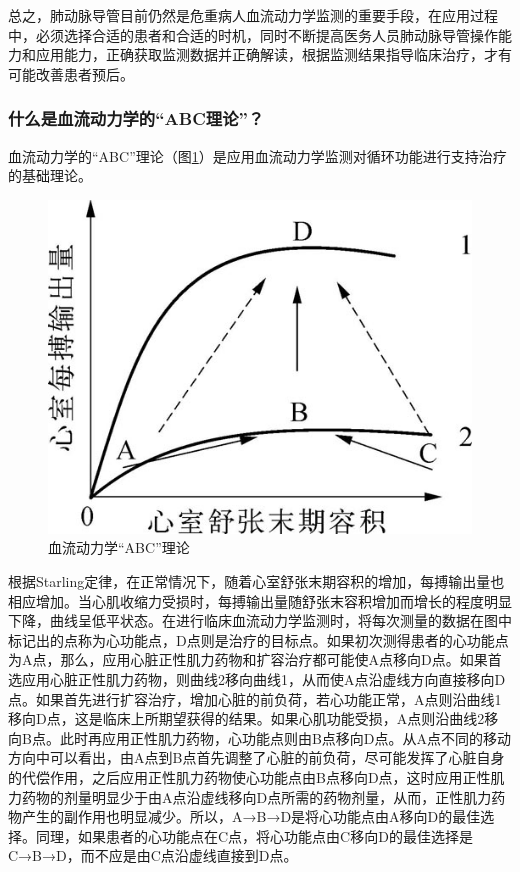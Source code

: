 总之，肺动脉导管目前仍然是危重病人血流动力学监测的重要手段，在应用过程中，必须选择合适的患者和合适的时机，同时不断提高医务人员肺动脉导管操作能力和应用能力，正确获取监测数据并正确解读，根据监测结果指导临床治疗，才有可能改善患者预后。

\subsubsection{什么是血流动力学的“ABC理论”？}

血流动力学的“ABC”理论（图\ref{fig4-11}）是应用血流动力学监测对循环功能进行支持治疗的基础理论。

\begin{figure}[!htbp]
 \centering
 \includegraphics{./images/Image00043.jpg}
 \captionsetup{justification=centering}
 \caption{血流动力学“ABC”理论}
 \label{fig4-11}
  \end{figure} 

根据Starling定律，在正常情况下，随着心室舒张末期容积的增加，每搏输出量也相应增加。当心肌收缩力受损时，每搏输出量随舒张末容积增加而增长的程度明显下降，曲线呈低平状态。在进行临床血流动力学监测时，将每次测量的数据在图中标记出的点称为心功能点，D点则是治疗的目标点。如果初次测得患者的心功能点为A点，那么，应用心脏正性肌力药物和扩容治疗都可能使A点移向D点。如果首选应用心脏正性肌力药物，则曲线2移向曲线1，从而使A点沿虚线方向直接移向D点。如果首先进行扩容治疗，增加心脏的前负荷，若心功能正常，A点则沿曲线1移向D点，这是临床上所期望获得的结果。如果心肌功能受损，A点则沿曲线2移向B点。此时再应用正性肌力药物，心功能点则由B点移向D点。从A点不同的移动方向中可以看出，由A点到B点首先调整了心脏的前负荷，尽可能发挥了心脏自身的代偿作用，之后应用正性肌力药物使心功能点由B点移向D点，这时应用正性肌力药物的剂量明显少于由A点沿虚线移向D点所需的药物剂量，从而，正性肌力药物产生的副作用也明显减少。所以，A→B→D是将心功能点由A移向D的最佳选择。同理，如果患者的心功能点在C点，将心功能点由C移向D的最佳选择是C→B→D，而不应是由C点沿虚线直接到D点。

